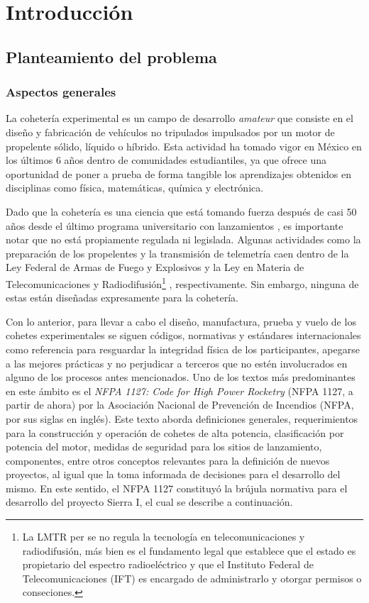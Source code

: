 \chapter{Introducción}

\section{Planteamiento del problema}
\subsection{Aspectos generales}
La cohetería experimental es un campo de desarrollo \emph{amateur} que consiste en el diseño y fabricación de vehículos no tripulados impulsados por un motor de propelente sólido, líquido o híbrido\cite[p.1127-7]{nfpa1127}. Esta actividad ha tomado vigor en México en los últimos 6 años dentro de comunidades estudiantiles, ya que ofrece una oportunidad de poner a prueba de forma tangible los aprendizajes obtenidos en disciplinas como física, matemáticas, química y electrónica.

Dado que la cohetería es una ciencia que está tomando fuerza después de casi 50 años desde el último programa universitario con lanzamientos \cite{cabo_tuna}, es importante notar que no está propiamente regulada ni legislada. Algunas actividades como la preparación de los propelentes y la transmisión de telemetría caen dentro de la Ley Federal de Armas de Fuego y Explosivos \cite{lfafe} y la Ley en Materia de Telecomunicaciones y Radiodifusión\footnote{La LMTR per se no regula la tecnología en telecomunicaciones y radiodifusión, más bien es el fundamento legal que establece que el estado es propietario del espectro radioeléctrico y que el Instituto Federal de Telecomunicaciones (IFT) es encargado de administrarlo y otorgar permisos o conseciones.} \cite{lmtr}, respectivamente. Sin embargo, ninguna de estas están diseñadas expresamente para la cohetería.

Con lo anterior, para llevar a cabo el diseño, manufactura, prueba y vuelo de los cohetes experimentales se siguen códigos, normativas y estándares internacionales como referencia para resguardar la integridad física de los participantes, apegarse a las mejores prácticas y no perjudicar a terceros que no estén involucrados en alguno de los procesos antes mencionados. Uno de los textos más predominantes en este ámbito es el \textit{NFPA 1127: Code for High Power Rocketry} (NFPA 1127, a partir de ahora) por la Asociación Nacional de Prevención de Incendios (NFPA, por sus siglas en inglés). Este texto aborda definiciones generales, requerimientos para la construcción y operación de cohetes de alta potencia, clasificación por potencia del motor, medidas de seguridad para los sitios de lanzamiento, componentes, entre otros conceptos relevantes para la definición de nuevos proyectos, al igual que la toma informada de decisiones para el desarrollo del mismo. En este sentido, el NFPA 1127 constituyó la brújula normativa para el desarrollo del proyecto Sierra I, el cual se describe a continuación.

